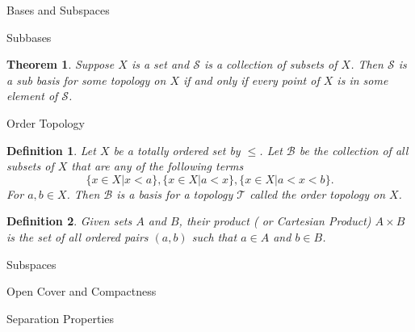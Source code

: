 \documentclass[12pt]{article}
\newtheorem{definition}{Definition}
\newtheorem{theorem}{Theorem}
\begin{document}
\begin{section}{Bases and Subspaces}
\begin{subsection}{Subbases}
\begin{theorem}
Suppose $X$ is a set and $\mathcal{S}$ is a collection of subsets of $X$. Then $\mathcal{S}$ is a sub basis for some topology on $X$ if and only if every point of $X$ is in some element of $\mathcal{S}$.
\end{theorem}

\end{subsection}

\begin{subsection}{Order Topology}

\begin{definition}
Let $X$ be a totally ordered set by $\leq$. Let $\mathcal{B}$ be the collection of all subsets of $X$ that are any of the following terms
$$
	\{ x\in X | x < a \}, \{ x\in X | a < x\}, \{x\in X | a< x < b\}.
$$
For $a,b\in X$. Then $\mathcal{B}$ is a basis for a topology $\mathcal{T}$ called the order topology on $X$.
\end{definition}

\begin{definition}
Given sets $A$ and $B$, their product ( or Cartesian Product) $A\times B$ is the set of all ordered pairs $(a,b)$ such that $a\in A$ and $b\in B$.
\end{definition}

\end{subsection}

\begin{subsection}{Subspaces}
\end{subsection}


\end{section}


\begin{section}{Open Cover and Compactness}
\end{section}




\begin{section}{Separation Properties}
\end{section}
\end{document}
